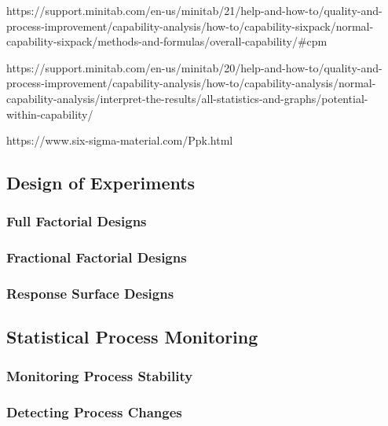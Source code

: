 \documentclass[11pt]{article}
\begin{document}
https://support.minitab.com/en-us/minitab/21/help-and-how-to/quality-and-process-improvement/capability-analysis/how-to/capability-sixpack/normal-capability-sixpack/methods-and-formulas/overall-capability/\#cpm

https://support.minitab.com/en-us/minitab/20/help-and-how-to/quality-and-process-improvement/capability-analysis/how-to/capability-analysis/normal-capability-analysis/interpret-the-results/all-statistics-and-graphs/potential-within-capability/

https://www.six-sigma-material.com/Ppk.html

    

    \hypertarget{design-of-experiments}{%
\subsection{Design of Experiments}\label{design-of-experiments}}

\hypertarget{full-factorial-designs}{%
\subsubsection{Full Factorial Designs}\label{full-factorial-designs}}

\hypertarget{fractional-factorial-designs}{%
\subsubsection{Fractional Factorial
Designs}\label{fractional-factorial-designs}}

\hypertarget{response-surface-designs}{%
\subsubsection{Response Surface
Designs}\label{response-surface-designs}}

\hypertarget{statistical-process-monitoring}{%
\subsection{Statistical Process
Monitoring}\label{statistical-process-monitoring}}

\hypertarget{monitoring-process-stability}{%
\subsubsection{Monitoring Process
Stability}\label{monitoring-process-stability}}

\hypertarget{detecting-process-changes}{%
\subsubsection{Detecting Process
Changes}\label{detecting-process-changes}}
\end{document}
